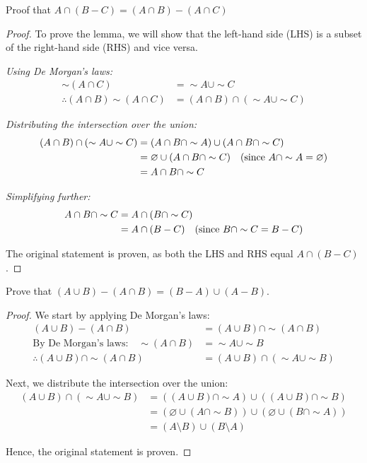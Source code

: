 \documentclass[
	12pt, %
	fleqn, %
	a4paper, %
]{LegrandOrangeBook}
\begin{document}
\begin{exercise}
    Proof that \( A \cap (B - C) = (A \cap B) - (A \cap C) \)
\end{exercise}
\begin{proof}
     To prove the lemma, we will show that the left-hand side (LHS) is a subset of the right-hand side (RHS) and vice versa.

\textit{Using De Morgan's laws:}
\begin{align*}
    \sim (A \cap C) &= \sim A \cup \sim C \\
    \therefore (A \cap B) \sim (A \cap C) &= (A \cap B) \cap (\sim A \cup \sim C)
\end{align*}

\textit{Distributing the intersection over the union:}
\begin{align*}
    (A \cap B) \cap (\sim A \cup \sim C) &= (A \cap B \cap \sim A) \cup (A \cap B \cap \sim C) \\
    &= \varnothing \cup (A \cap B \cap \sim C) \quad \text{(since \( A \cap \sim A = \varnothing \))} \\
    &= A \cap B \cap \sim C
\end{align*}

\textit{Simplifying further:}
\begin{align*}
    A \cap B \cap \sim C &= A \cap (B \cap \sim C) \\
    &= A \cap (B - C) \quad \text{(since \( B \cap \sim C = B - C \))}
\end{align*}

The original statement is proven, as both the LHS and RHS equal \( A \cap (B - C) \).
\end{proof}
\begin{exercise}
   Prove that  \( (A \cup B) - (A \cap B) = (B - A) \cup (A - B) \).
\end{exercise}
\begin{proof}
    We start by applying De Morgan's laws:
\begin{align*}
    (A \cup B) - (A \cap B) &= (A \cup B) \cap \sim (A \cap B) \\
    \text{By De Morgan's laws:} \quad \sim (A \cap B) &= \sim A \cup \sim B \\
    \therefore (A \cup B) \cap \sim (A \cap B) &= (A \cup B) \cap (\sim A \cup \sim B)
\end{align*}

Next, we distribute the intersection over the union:
\begin{align*}
    (A \cup B) \cap (\sim A \cup \sim B) &= ((A \cup B) \cap \sim A) \cup ((A \cup B) \cap \sim B) \\
    &= (\varnothing \cup (A \cap \sim B)) \cup (\varnothing \cup (B \cap \sim A)) \\
    &= (A \setminus B) \cup (B \setminus A)
\end{align*}

Hence, the original statement is proven.
\end{proof}
\end{document}
